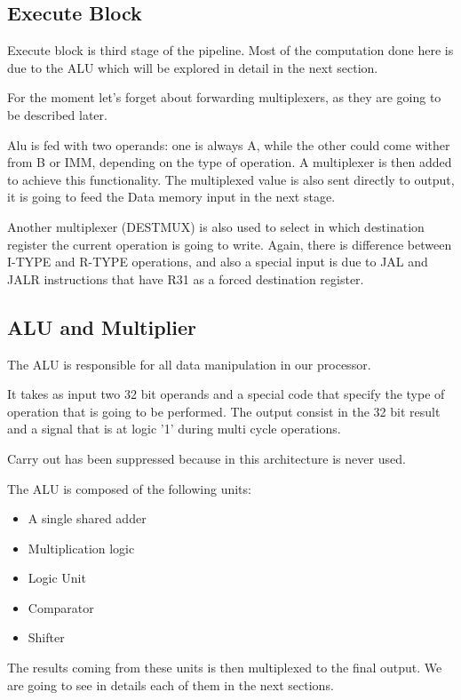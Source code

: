 \documentclass[12pt]{article}
\begin{document}
\subsection{Execute Block}
Execute block is third stage of the pipeline. Most of the computation done here is due to the ALU which will be explored in detail in the next section.

For the moment let's forget about forwarding multiplexers, as they are going to be described later.

Alu is fed with two operands: one is always A, while the other could come wither from B or IMM, depending on the type of operation. A multiplexer is then added to achieve this functionality.
The multiplexed value is also sent directly to output, it is going to feed the Data memory input in the next stage.

Another multiplexer (DESTMUX) is also used to select in which destination register the current operation is going to write. Again, there is difference between I-TYPE and R-TYPE operations, and also a special input is due to JAL and JALR instructions that have R31 as a forced destination register.

 
\subsection{ALU and Multiplier}
The ALU is responsible for all data manipulation in our processor.

It takes as input two 32 bit operands and a special code that specify the type of operation that is going to be performed.
The output consist in the 32 bit result and a signal that is at logic '1' during multi cycle operations.

Carry out has been suppressed because in this architecture is never used.

The ALU is composed of the following units:

\begin{itemize}
	\item A single shared adder
	\item Multiplication logic
	\item Logic Unit
	\item Comparator
	\item Shifter
\end{itemize}

The results coming from these units is then multiplexed to the final output.
We are going to see in details each of them in the next sections.
\end{document}
